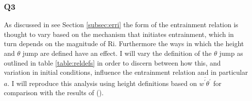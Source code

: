 \subsubsection{Q3}
As discussed in see Section \ref{subsec:erri} the form of the entrainment relation is thought to vary based on the mechanism that initiates entrainment, which in turn depends on the magnitude of \acs{Ri}.  Furthermore the ways in which the height and $\theta$ jump are defined have an effect. I will vary the definition of the $\theta$ jump as outlined in table \ref{table:reldefs} in order to discern between how this, and variation in initial conditions, influence the entrainment relation and in particular $a$. I will reproduce this analysis using height definitions based on $\overline{w^{'}\theta^{'}}$ for comparison with the results of \citeauthor{FedConzMir04} (\citeyear{FedConzMir04}).

\endinput

Any text after an \endinput is ignored.
You could put scraps here or things in progress.



